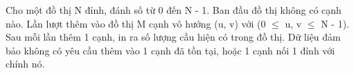 Cho một đồ thị N đỉnh, đánh số từ 0 đến N - 1. Ban đầu đồ thị không có cạnh nào. Lần lượt thêm vào đồ thị M cạnh vô hướng (u, v) với (0  $\le$  u, v  $\le$  N - 1). Sau mỗi lần thêm 1 cạnh, in ra số lượng cầu hiện có trong đồ thị. Dữ liệu đảm bảo không có yêu cầu thêm vào 1 cạnh đã tồn tại, hoặc 1 cạnh nối 1 đỉnh với chính nó.  

\
